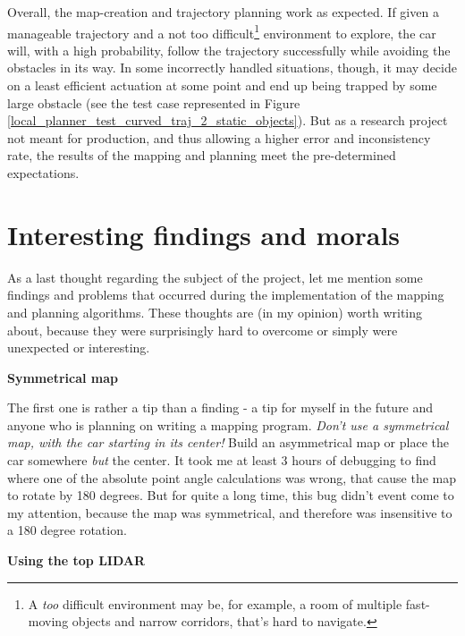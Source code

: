 Overall, the map-creation and trajectory planning work as expected. If given a manageable trajectory and a not too difficult\footnote{A \textit{too} difficult environment may be, for example, a room of multiple fast-moving objects and narrow corridors, that's hard to navigate.} environment to explore, the car will, with a high probability, follow the trajectory successfully while avoiding the obstacles in its way. In some incorrectly handled situations, though, it may decide on a least efficient actuation at some point and end up being trapped by some large obstacle (see the test case represented in Figure \ref{local_planner_test_curved_traj_2_static_objects}). But as a research project not meant for production, and thus allowing a higher error and inconsistency rate, the results of the mapping and planning meet the pre-determined expectations.

\section{Interesting findings and morals}
\label{chap:interesting_findings}
As a last thought regarding the subject of the project, let me mention some findings and problems that occurred during the implementation of the mapping and planning algorithms. These thoughts are (in my opinion) worth writing about, because they were surprisingly hard to overcome or simply were unexpected or interesting.

\textbf{Symmetrical map}

The first one is rather a tip than a finding - a tip for myself in the future and anyone who is planning on writing a mapping program. \textit{Don't use a symmetrical map, with the car starting in its center!} Build an asymmetrical map or place the car somewhere \textit{but} the center. It took me at least 3 hours of debugging to find where one of the absolute point angle calculations was wrong, that cause the  map to rotate by 180 degrees. But for quite a long time, this bug didn't event come to my attention, because the map was symmetrical, and therefore was insensitive to a 180 degree rotation.

\textbf{Using the top LIDAR}

